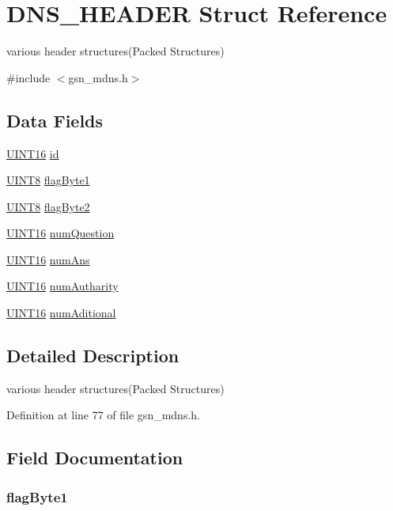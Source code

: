 \hypertarget{a00013}{
\section{DNS\_\-HEADER Struct Reference}
\label{a00013}
}


various header structures(Packed Structures)  




{\ttfamily \#include $<$gsn\_\-mdns.h$>$}

\subsection*{Data Fields}
\begin{DoxyCompactItemize}
\item 
\hyperlink{a00660_ga09f1a1fb2293e33483cc8d44aefb1eb1}{UINT16} \hyperlink{a00013_a31bec522c0189684470da68509e1413e}{id}
\item 
\hyperlink{a00660_gab27e9918b538ce9d8ca692479b375b6a}{UINT8} \hyperlink{a00013_a864a56b92845634a7651f559dd3806f4}{flagByte1}
\item 
\hyperlink{a00660_gab27e9918b538ce9d8ca692479b375b6a}{UINT8} \hyperlink{a00013_a52dc4745e83026bc6777869962425dc6}{flagByte2}
\item 
\hyperlink{a00660_ga09f1a1fb2293e33483cc8d44aefb1eb1}{UINT16} \hyperlink{a00013_ace2f6735b9b6967e5f120d3e00514d26}{numQuestion}
\item 
\hyperlink{a00660_ga09f1a1fb2293e33483cc8d44aefb1eb1}{UINT16} \hyperlink{a00013_a0e367fb69c3999f885676f93c0fb7384}{numAns}
\item 
\hyperlink{a00660_ga09f1a1fb2293e33483cc8d44aefb1eb1}{UINT16} \hyperlink{a00013_afb2e0e1f63d6234e385007fd62733d4e}{numAutharity}
\item 
\hyperlink{a00660_ga09f1a1fb2293e33483cc8d44aefb1eb1}{UINT16} \hyperlink{a00013_a213d75c50c6c0ed507aa2f90dbea4b31}{numAditional}
\end{DoxyCompactItemize}


\subsection{Detailed Description}
various header structures(Packed Structures) 

Definition at line 77 of file gsn\_\-mdns.h.



\subsection{Field Documentation}
\hypertarget{a00013_a864a56b92845634a7651f559dd3806f4}{
\subsubsection[{flagByte1}]{ {\bf flagByte1}}}
\label{a00013_a864a56b92845634a7651f559dd3806f4}


